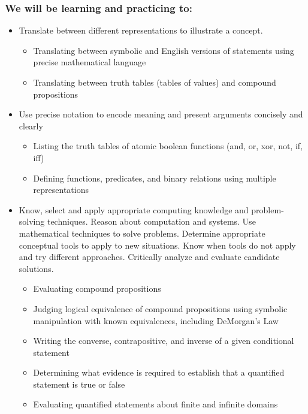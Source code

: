 \subsubsection*{We will be learning and practicing to:}
\begin{itemize}

\item Translate between different representations to illustrate a concept.
\begin{itemize}
   \item Translating between symbolic and English versions of statements using precise mathematical language
   \item Translating between truth tables (tables of values) and compound propositions
\end{itemize}

\item Use precise notation to encode meaning and present arguments concisely and clearly
\begin{itemize}
    \item Listing the truth tables of atomic boolean functions (and, or, xor, not, if, iff)
    \item Defining functions, predicates, and binary relations using multiple representations
\end{itemize}

\item Know, select and apply appropriate computing knowledge and problem-solving techniques. Reason about computation and systems. Use mathematical techniques to solve problems. Determine appropriate conceptual tools to apply to new situations. Know when tools do not apply and try different approaches. Critically analyze and evaluate candidate solutions.
\begin{itemize}
    \item Evaluating compound propositions
    \item Judging logical equivalence of compound propositions using symbolic manipulation with known equivalences, including DeMorgan's Law
    \item Writing the converse, contrapositive, and inverse of a given conditional statement
    \item Determining what evidence is required to establish that a quantified statement is true or false
    \item Evaluating quantified statements about finite and infinite domains
\end{itemize}

\end{itemize}

